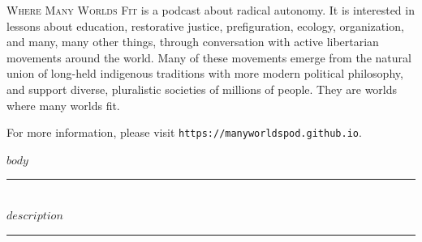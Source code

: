 \documentclass[12pt]{article}
\def\blankpage{\clearpage\thispagestyle{empty}\null\clearpage}
\newcommand{\HRule}{\rule{\linewidth}{0.5mm}}
\begin{document}

\thispagestyle{empty}
\setcounter{page}{2}
\vspace*{6cm}
\textsc{Where Many Worlds Fit} is a podcast about radical autonomy. It is
interested in lessons about education, restorative justice, prefiguration,
ecology, organization, and many, many other things, through conversation
with active libertarian movements around the world. Many of these movements
emerge from the natural union of long-held indigenous traditions with more
modern political philosophy, and support diverse, pluralistic societies of
millions of people. They are worlds where many worlds fit.

For more information, please visit \texttt{https://manyworldspod.github.io}.
\clearpage

\thispagestyle{empty}
\tableofcontents
\clearpage
\blankpage

$body$

\clearpage
\checkoddpage
\ifoddpage
    \blankpage
\fi
\thispagestyle{empty}
\vspace*{6cm}
\noindent\HRule \\[0.5cm]
\textit{\large $description$} \\[0.3cm]
\HRule
\end{document}
